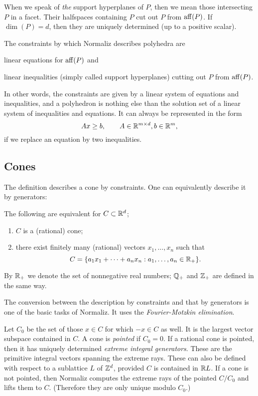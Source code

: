 When we speak of \emph{the} support hyperplanes of $P$, then we mean those intersecting $P$ in a facet. Their halfspaces containing $P$ cut out $P$ from $\operatorname{aff}(P)$. If $\dim(P)=d$, then they are uniquely determined (up to a positive scalar).

The constraints by which Normaliz describes polyhedra are
\begin{arab}
	\item linear equations for $\operatorname{aff}(P)$ and
	\item linear inequalities (simply called support hyperplanes) cutting out $P$ from $\operatorname{aff}(P)$.
\end{arab}
In other words, the constraints are given by a linear system of equations and inequalities, and a polyhedron is nothing else than the solution set of a linear system of inequalities and equations. It can always be represented in the form
$$
Ax\ge b, \qquad A\in{\mathbb R}^{m\times d}, b\in {\mathbb R}^m,
$$
if we replace an equation by two inequalities.

\subsection{Cones}

The definition describes a cone by constraints. One can equivalently describe it by generators:

\begin{theorem}
	The following are equivalent for $C\subset{\mathbb R}^d$;
	\begin{enumerate}
		\item $C$ is a (rational) cone;
		\item there exist finitely many (rational) vectors $x_1,\dots,x_n$ such that
		$$
		C=\{a_1x_1+\dots+a_nx_n:a_1,\dots,a_n\in{\mathbb R}_+\}.
		$$
	\end{enumerate}
\end{theorem}

By ${\mathbb R}_+$ we denote the set of nonnegative real numbers; ${\mathbb Q}_+$ and ${\mathbb Z}_+$ are defined in the same way.

The conversion between the description by constraints and that by generators is one of the basic tasks of Normaliz. It uses the \emph{Fourier-Motzkin elimination}.

Let $C_0$ be the set of those $x\in C$ for which $-x\in C$ as well. It is the largest vector subspace contained in $C$.
A cone is \emph{pointed} if $C_0=0$. If a rational cone is pointed, then it has uniquely determined \emph{extreme integral generators}. These are the primitive integral vectors spanning the extreme rays. These can also be defined with respect to a sublattice $L$ of ${\mathbb Z}^d$, provided $C$ is contained in ${\mathbb R} L$. If a cone is not pointed, then Normaliz computes the extreme rays of the pointed $C/C_0$ and lifts them to $C$. (Therefore they are only unique modulo $C_0$.)

